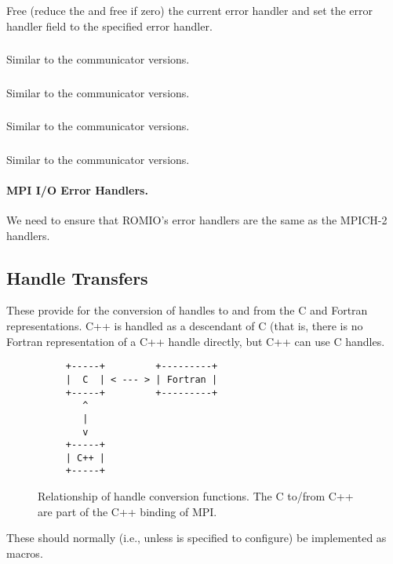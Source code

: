 \documentclass{article}
\begin{document}
Free (reduce the  and free if zero) the current error handler
and set the error handler field to the specified error handler.

\subsubsection{}
Similar to the communicator versions.

\subsubsection{}
Similar to the communicator versions.

\subsubsection{}
Similar to the communicator versions.

\subsubsection{}
Similar to the communicator versions.

\paragraph{MPI I/O Error Handlers.}
We need to ensure that ROMIO's error handlers are the same as the MPICH-2
handlers.

\subsection{Handle Transfers}
These provide for the conversion of handles to and from the C and
Fortran representations.  C++ is handled as a descendant of C (that
is, there is no Fortran representation of a C++ handle directly, but
C++ can use C handles.  
\begin{figure}
\begin{verbatim}
     +-----+         +---------+
     |  C  | < --- > | Fortran |
     +-----+         +---------+
        ^
        |
        v
     +-----+ 
     | C++ | 
     +-----+ 
\end{verbatim}
\caption{Relationship of handle conversion functions.  The C to/from
C++ are part of the C++ binding of MPI.}\label{fig:handle-transfers}
\end{figure}
These should normally (i.e., unless
 is
specified to configure) be implemented as macros.  
\end{document}
